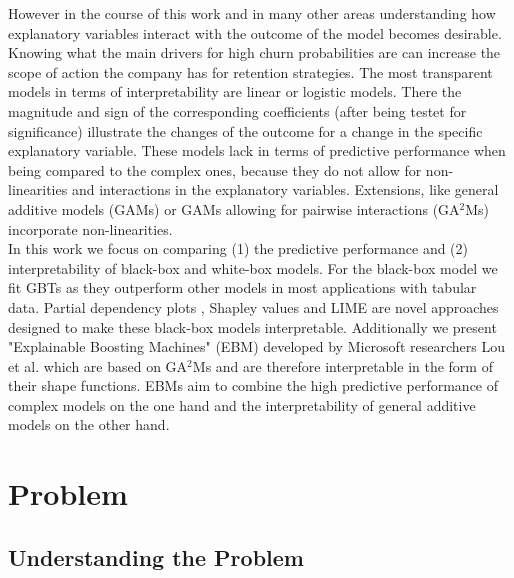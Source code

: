\documentclass[12pt,titlepage]{article}
\begin{document}
However in the course of this work and in many other areas understanding how explanatory variables interact with the outcome of the model becomes desirable. Knowing what the main drivers for high churn probabilities are can increase the scope of action the company has for retention strategies. The most transparent models in terms of interpretability are linear or logistic models. There the magnitude and sign of the corresponding coefficients (after being testet for significance) illustrate the changes of the outcome for a change in the specific explanatory variable. These models lack in terms of predictive performance when being compared to the complex ones, because they do not allow for non-linearities and interactions in the explanatory variables. Extensions, like general additive models (GAMs) \cite{gam} or GAMs allowing for pairwise interactions (GA$^{2}$Ms) \cite{ga2m} incorporate non-linearities.\\
In this work we focus on comparing (1) the predictive performance and (2) interpretability of black-box and white-box models. For the black-box model we fit GBTs \cite{gbt} as they outperform other models in most applications with tabular data. Partial dependency plots \cite{pdp}, Shapley values \cite{shap} and LIME \cite{lime} are novel approaches designed to make these black-box models interpretable. Additionally we present "Explainable Boosting Machines" (EBM) developed by Microsoft researchers Lou et al. \cite{interpretml} which are based on GA$^{2}$Ms and are therefore interpretable in the form of their shape functions. EBMs aim to combine the high predictive performance of complex models on the one hand and the interpretability of general additive models on the other hand. \\

\section{Problem} \par

\subsection{Understanding the Problem} \par
\end{document}
